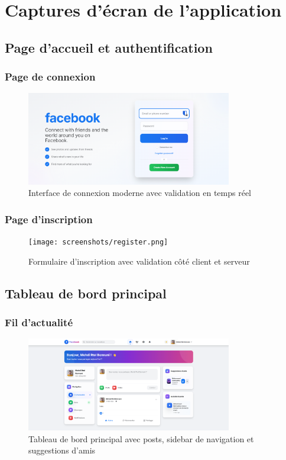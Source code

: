 \documentclass[12pt,a4paper]{article}
\begin{document}
\section{Captures d'\'ecran de l'application}

\subsection{Page d'accueil et authentification}

\subsubsection{Page de connexion}
\begin{figure}[H]
    \centering
    \includegraphics[width=0.8\textwidth]{screenshots/login.png}
    \caption{Interface de connexion moderne avec validation en temps r\'eel}
    \label{fig:login}
\end{figure}

\subsubsection{Page d'inscription}
\begin{figure}[H]
    \centering
    \texttt{[image: screenshots/register.png]}
    \caption{Formulaire d'inscription avec validation c\^ot\'e client et serveur}
    \label{fig:register}
\end{figure}

\subsection{Tableau de bord principal}

\subsubsection{Fil d'actualit\'e}
\begin{figure}[H]
    \centering
    \includegraphics[width=0.8\textwidth]{screenshots/dashboard.png}
    \caption{Tableau de bord principal avec posts, sidebar de navigation et suggestions d'amis}
    \label{fig:dashboard}
\end{figure}
\end{document}
